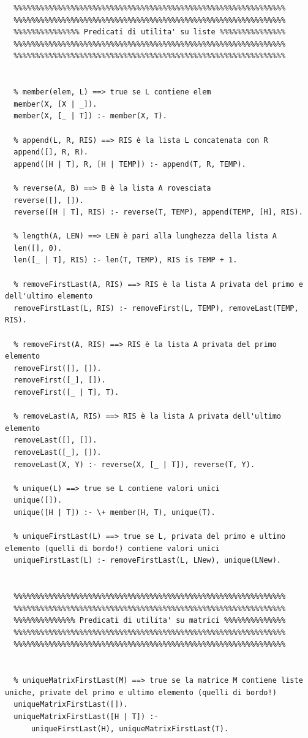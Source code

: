 \documentclass{article}
\begin{document}
\begin{lstlisting}
  %%%%%%%%%%%%%%%%%%%%%%%%%%%%%%%%%%%%%%%%%%%%%%%%%%%%%%%%%%%%%%
  %%%%%%%%%%%%%%%%%%%%%%%%%%%%%%%%%%%%%%%%%%%%%%%%%%%%%%%%%%%%%%
  %%%%%%%%%%%%%%% Predicati di utilita' su liste %%%%%%%%%%%%%%%
  %%%%%%%%%%%%%%%%%%%%%%%%%%%%%%%%%%%%%%%%%%%%%%%%%%%%%%%%%%%%%%
  %%%%%%%%%%%%%%%%%%%%%%%%%%%%%%%%%%%%%%%%%%%%%%%%%%%%%%%%%%%%%%
  
  
  % member(elem, L) ==> true se L contiene elem
  member(X, [X | _]).
  member(X, [_ | T]) :- member(X, T).
  
  % append(L, R, RIS) ==> RIS è la lista L concatenata con R
  append([], R, R).
  append([H | T], R, [H | TEMP]) :- append(T, R, TEMP).
  
  % reverse(A, B) ==> B è la lista A rovesciata
  reverse([], []).
  reverse([H | T], RIS) :- reverse(T, TEMP), append(TEMP, [H], RIS).
  
  % length(A, LEN) ==> LEN è pari alla lunghezza della lista A
  len([], 0).
  len([_ | T], RIS) :- len(T, TEMP), RIS is TEMP + 1.
  
  % removeFirstLast(A, RIS) ==> RIS è la lista A privata del primo e dell'ultimo elemento
  removeFirstLast(L, RIS) :- removeFirst(L, TEMP), removeLast(TEMP, RIS).
  
  % removeFirst(A, RIS) ==> RIS è la lista A privata del primo elemento
  removeFirst([], []).
  removeFirst([_], []).
  removeFirst([_ | T], T). 
  
  % removeLast(A, RIS) ==> RIS è la lista A privata dell'ultimo elemento
  removeLast([], []).
  removeLast([_], []).
  removeLast(X, Y) :- reverse(X, [_ | T]), reverse(T, Y).
  
  % unique(L) ==> true se L contiene valori unici
  unique([]).
  unique([H | T]) :- \+ member(H, T), unique(T).
  
  % uniqueFirstLast(L) ==> true se L, privata del primo e ultimo elemento (quelli di bordo!) contiene valori unici
  uniqueFirstLast(L) :- removeFirstLast(L, LNew), unique(LNew).
  

  %%%%%%%%%%%%%%%%%%%%%%%%%%%%%%%%%%%%%%%%%%%%%%%%%%%%%%%%%%%%%%
  %%%%%%%%%%%%%%%%%%%%%%%%%%%%%%%%%%%%%%%%%%%%%%%%%%%%%%%%%%%%%%
  %%%%%%%%%%%%%% Predicati di utilita' su matrici %%%%%%%%%%%%%%
  %%%%%%%%%%%%%%%%%%%%%%%%%%%%%%%%%%%%%%%%%%%%%%%%%%%%%%%%%%%%%%
  %%%%%%%%%%%%%%%%%%%%%%%%%%%%%%%%%%%%%%%%%%%%%%%%%%%%%%%%%%%%%%
  
  
  % uniqueMatrixFirstLast(M) ==> true se la matrice M contiene liste uniche, private del primo e ultimo elemento (quelli di bordo!)
  uniqueMatrixFirstLast([]).
  uniqueMatrixFirstLast([H | T]) :- 
      uniqueFirstLast(H), uniqueMatrixFirstLast(T).
  

\end{lstlisting}
\end{document}
